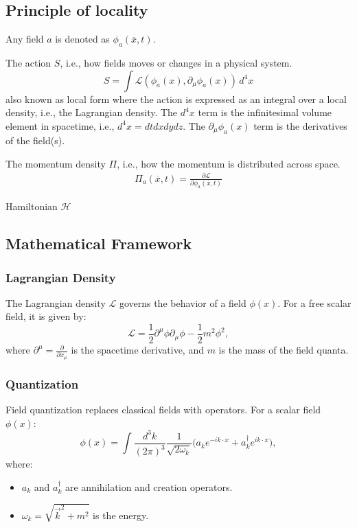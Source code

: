\subsection{Principle of locality}
Any field $a$ is denoted as $\phi_a(\overline{x},t)$.

The action $S$, i.e., how fields moves or changes in a physical system.
\begin{equation*}
    S = \int \mathcal{L}(\phi_a(x), \partial_\mu \phi_a(x)) \, d^4x
\end{equation*}
also known as local form where the action is expressed as an integral over a local density, i.e., the Lagrangian density.
The $d^4x$ term is the infinitesimal volume element in spacetime, i.e., $d^4x=dtdxdydz$.
The $\partial_\mu \phi_a(x)$ term is the derivatives of the field(s).


The momentum density $\Pi$, i.e., how the momentum is distributed across space.
\begin{eqnarray*}
    \Pi_a(\overline{x},t) = \frac{\partial \mathcal{L}}{\partial \phi_a(\overline{x},t)}
\end{eqnarray*}

Hamiltonian $\mathcal{H}$

\subsection{Mathematical Framework}
\subsubsection{Lagrangian Density}
The Lagrangian density \(\mathcal{L}\) governs the behavior of a field \(\phi(x)\). For a free scalar field, it is given by:
\[
\mathcal{L} = \frac{1}{2} \partial^\mu \phi \partial_\mu \phi - \frac{1}{2}m^2\phi^2,
\]
where \(\partial^\mu = \frac{\partial}{\partial x_\mu}\) is the spacetime derivative, and \(m\) is the mass of the field quanta.

\subsubsection{Quantization}
Field quantization replaces classical fields with operators. For a scalar field \(\phi(x)\):
\[
\phi(x) = \int \frac{d^3k}{(2\pi)^3} \frac{1}{\sqrt{2\omega_k}} \Big( a_k e^{-i k \cdot x} + a_k^\dagger e^{i k \cdot x} \Big),
\]
where:
\begin{itemize}
    \item \(a_k\) and \(a_k^\dagger\) are annihilation and creation operators.
    \item \(\omega_k = \sqrt{\vec{k}^2 + m^2}\) is the energy.
\end{itemize}

